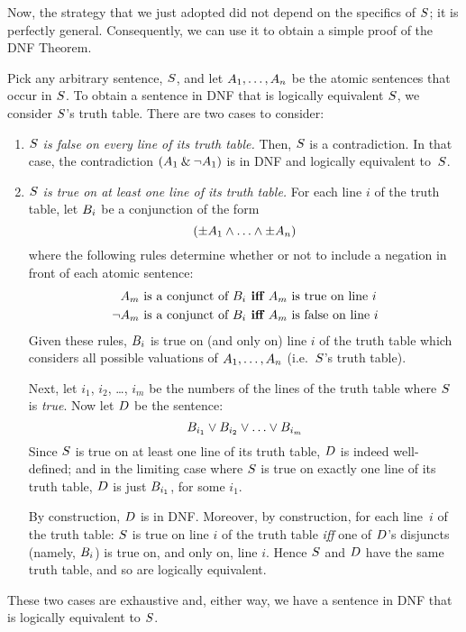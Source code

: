 Now, the strategy that we just adopted did not depend on the specifics of $S$; it is perfectly general. Consequently, we can use it to obtain a simple proof of the DNF Theorem.

Pick any arbitrary sentence, $S$, and let $A_1, \ldots, A_n$ be the atomic sentences that occur in $S$. To obtain a sentence in DNF that is logically equivalent $S$, we consider $S$'s truth table. There are two cases to consider:
	\begin{enumerate}
		\item \emph{$S$ is false on every line of its truth table.} Then, $S$ is a contradiction. In that case, the contradiction $(A_1 \mathbin{\&} \neg A_1)$ is in DNF and logically equivalent to~$S$.

		\item \emph{$S$ is true on at least one line of its truth table.}
		For each line $i$ of the truth table, let $B_i$ be a conjunction of the form
		$$(\pm A_1 \land \ldots \land \pm A_n)$$
		where the following rules determine whether or not to include a negation in front of each atomic sentence:
			\begin{align*}
				A_m\text{ is a conjunct of }B_i&\textbf{ iff }A_m\text{ is true on line }i\\
				\neg A_m\text{ is a conjunct of }B_i&\textbf{ iff }A_m\text{ is false on line }i
			\end{align*}
		Given these rules, $B_i$ is true on (and only on) line $i$ of the truth table which considers all possible valuations of $A_1, \ldots, A_n$ (i.e.\ $S$'s truth table).

		Next, let $i_1$, $i_2$, \dots, $i_m$ be the numbers of the lines of the truth table where $S$ is \emph{true}. Now let $D$ be the sentence:
		$$B_{i_1} \vee B_{i_2} \vee \ldots \vee B_{i_m}$$
		Since $S$ is true on at least one line of its truth table, $D$ is indeed well-defined; and in the limiting case where $S$ is true on exactly one line of its truth table, $D$ is just $B_{i_1}$, for some $i_1$.

		By construction, $D$ is in DNF. Moreover, by construction, for each line~$i$ of the truth table: $S$ is true on line $i$ of the truth table \emph{iff} one of $D$'s disjuncts (namely, $B_i$) is true on, and only on, line $i$. Hence $S$ and $D$ have the same truth table, and so are logically equivalent.
	\end{enumerate}
	These two cases are exhaustive and, either way, we have a sentence in DNF that is logically equivalent to $S$.

